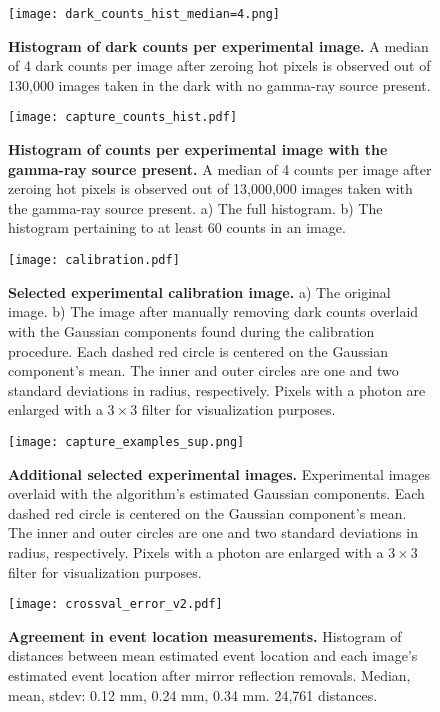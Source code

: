 \documentclass{article}
\begin{document}
\begin{figure}
\centering
\texttt{[image: dark\_counts\_hist\_median=4.png]}
\caption{\textbf{Histogram of dark counts per experimental image.} 
A median of 4 dark counts per image after zeroing hot pixels is observed out of 
130,000 images taken in the dark with no gamma-ray source present.} 
\label{fig:dark_counts_hist}
\end{figure}


\begin{figure}
\centering
\texttt{[image: capture\_counts\_hist.pdf]}
\caption{\textbf{Histogram of counts per experimental image with the gamma-ray source present.} A median of 4 counts 
per image after zeroing hot pixels is observed out of 13,000,000 images taken with 
the gamma-ray source present. 
a) The full histogram. 
b) The histogram pertaining to at least 60 counts in an image.} 
\label{fig:cap_counts_hist}
\end{figure}


\begin{figure*}
\centering
\texttt{[image: calibration.pdf]}
\caption{\textbf{Selected experimental calibration image.} a) The original image. b) The image after manually 
removing dark counts overlaid with the Gaussian components found during the 
calibration procedure.
Each dashed red circle is centered on the Gaussian component's mean. 
The inner and outer circles are one and two standard deviations in radius, respectively.
Pixels with a photon are enlarged with a $3 \times 3$ filter for visualization purposes.
} 
\label{fig:calibration}
\end{figure*}

\begin{figure*}
\centering
\texttt{[image: capture\_examples\_sup.png]}
\caption{\textbf{Additional selected experimental images.} Experimental images overlaid with the algorithm's estimated Gaussian components.
Each dashed red circle is centered on the Gaussian component's mean. 
The inner and outer circles are one and two standard deviations in radius, respectively.
Pixels with a photon are enlarged with a $3 \times 3$ filter for visualization purposes.
} 
\label{fig:example_figures_sup}
\end{figure*}


\begin{figure}
\centering
\texttt{[image: crossval\_error\_v2.pdf]}
\caption{\textbf{Agreement in event location measurements.} Histogram of distances 
between mean estimated event location and each image's estimated event location 
after mirror reflection removals. Median, mean, stdev: 0.12 mm, 0.24 mm, 0.34 mm. 24,761 distances.
} 
\label{fig:crossval_error}
\end{figure}
\end{document}
